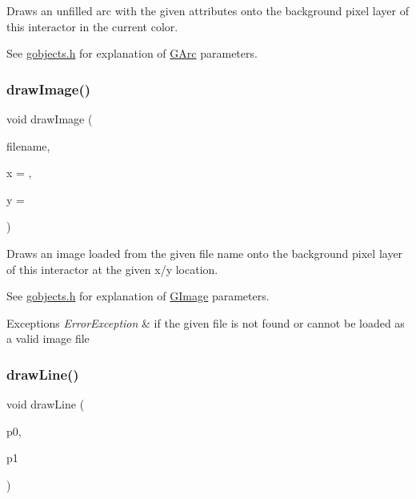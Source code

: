 Draws an unfilled arc with the given attributes onto the background pixel layer of this interactor in the current color. 

See \mbox{\hyperlink{gobjects_8h_source}{gobjects.\+h}} for explanation of \mbox{\hyperlink{classGArc}{G\+Arc}} parameters. \mbox{\label{classGDrawingSurface_abdd4cb1f2c64adc5d03522a1ee30febf}} 
\subsubsection{\texorpdfstring{draw\+Image()}{drawImage()}}
{\footnotesize\ttfamily void draw\+Image (\begin{DoxyParamCaption}\item[{const std\+::string \&}]{filename,  }\item[{double}]{x = {},  }\item[{double}]{y = {} }\end{DoxyParamCaption})\hspace{0.3cm}{\ttfamily [virtual]}}



Draws an image loaded from the given file name onto the background pixel layer of this interactor at the given x/y location. 

See \mbox{\hyperlink{gobjects_8h_source}{gobjects.\+h}} for explanation of \mbox{\hyperlink{classGImage}{G\+Image}} parameters. 
\begin{DoxyExceptions}{Exceptions}
{\em Error\+Exception} & if the given file is not found or cannot be loaded as a valid image file \\
\hline
\end{DoxyExceptions}
\mbox{\label{classGDrawingSurface_ae6a24b6b9a6e795d3165c1c750d5bdf1}} 
\subsubsection{\texorpdfstring{draw\+Line()}{drawLine()}\hspace{0.1cm}{\footnotesize\ttfamily [1/2]}}
{\footnotesize\ttfamily void draw\+Line (\begin{DoxyParamCaption}\item[{const \mbox{\hyperlink{structGPoint}{G\+Point}} \&}]{p0,  }\item[{const \mbox{\hyperlink{structGPoint}{G\+Point}} \&}]{p1 }\end{DoxyParamCaption})\hspace{0.3cm}{\ttfamily [virtual]}}



